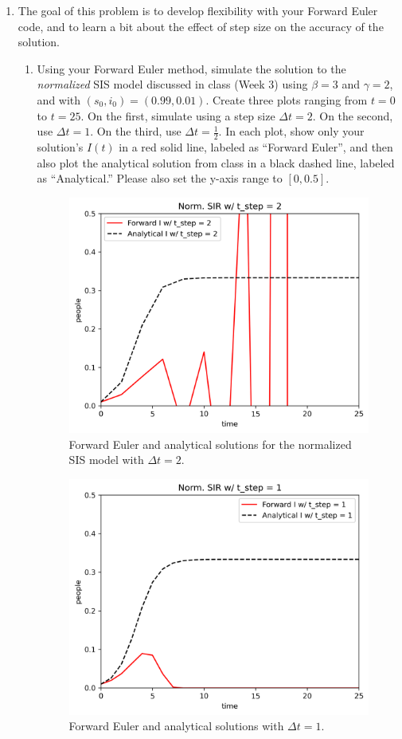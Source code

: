 \documentclass[11pt]{article}
\begin{document}
\begin{enumerate}
	\item The goal of this problem is to develop flexibility with your Forward Euler code, and to learn a bit about the effect of step size on the accuracy of the solution.
	
\begin{enumerate}[label=\alph*.]
	\item Using your Forward Euler method, simulate the solution to the {\it normalized} SIS model discussed in class (Week 3) using $\beta=3$ and $\gamma=2$, and with $(s_0, i_0) = (0.99, 0.01)$. Create three plots ranging from $t=0$ to $t=25$. On the first, simulate using a step size $\Delta t=2$. On the second, use $\Delta t =1$. On the third, use $\Delta t = \tfrac{1}{2}$. In each plot, show only your solution's $I(t)$ in a red solid line, labeled as ``Forward Euler'', and then also plot the analytical solution from class in a black dashed line, labeled as ``Analytical.'' Please also set the y-axis range to $[0,0.5]$. 
	\begin{figure}[H]
		\centering
		\includegraphics[width=0.5\linewidth]{figures/sir_dt2.png}
		\caption{Forward Euler and analytical solutions for the normalized SIS model with $\Delta t = 2$.}
		\label{fig:sir_dt2}
	\end{figure}
	
	\begin{figure}[H]
		\centering
		\includegraphics[width=0.5\linewidth]{figures/sir_dt1.png}
		\caption{Forward Euler and analytical solutions with $\Delta t = 1$.}
		\label{fig:sir_dt1}
	\end{figure}
	

\end{enumerate}
\end{enumerate}
\end{document}
